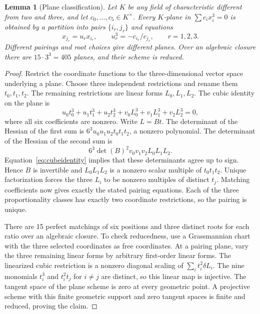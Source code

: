 \documentclass[11pt]{article}
\newtheorem{lemma}[theorem]{Lemma}
\theoremstyle{remark}\newtheorem{remark}[theorem]{Remark}
\begin{document}
\begin{lemma}[Plane classification]\label{lem:planes}
Let $K$ be any field of characteristic different from two and three, and let $c_0,\ldots,c_5\in K^\times$. Every $K$-plane in $\sum c_i x_i^3=0$ is obtained by a partition into pairs $\{i_r,j_r\}$ and equations
\[
x_{j_r}=u_r x_{i_r},\qquad u_r^3=-c_{i_r}/c_{j_r},\qquad r=1,2,3.
\]
Different pairings and root choices give different planes. Over an algebraic closure there are $15\cdot3^3=405$ planes, and their scheme is reduced.
\end{lemma}
\begin{proof}
Restrict the coordinate functions to the three-dimensional vector space underlying a plane. Choose three independent restrictions and rename them $t_0,t_1,t_2$. The remaining restrictions are linear forms $L_0,L_1,L_2$. The cubic identity on the plane is
\begin{equation}\label{eq:cubeidentity}
u_0t_0^3+u_1t_1^3+u_2t_2^3+
 v_0L_0^3+v_1L_1^3+v_2L_2^3=0,
\end{equation}
where all six coefficients are nonzero. Write $L=Bt$. The determinant of the Hessian of the first sum is
$6^3u_0u_1u_2t_0t_1t_2$, a nonzero polynomial. The determinant of the Hessian of the second sum is
\[
6^3\det(B)^2v_0v_1v_2L_0L_1L_2.
\]
Equation~\eqref{eq:cubeidentity} implies that these determinants agree up to sign. Hence $B$ is invertible and $L_0L_1L_2$ is a nonzero scalar multiple of $t_0t_1t_2$. Unique factorization forces the three $L_i$ to be nonzero multiples of distinct $t_j$. Matching coefficients now gives exactly the stated pairing equations. Each of the three proportionality classes has exactly two coordinate restrictions, so the pairing is unique.

There are 15 perfect matchings of six positions and three distinct roots for each ratio over an algebraic closure. To check reducedness, use a Grassmannian chart with the three selected coordinates as free coordinates. At a pairing plane, vary the three remaining linear forms by arbitrary first-order linear forms. The linearized cubic restriction is a nonzero diagonal scaling of
$\sum_i t_i^2\delta L_i$. The nine monomials $t_i^3$ and $t_i^2t_j$ for $i\ne j$ are distinct, so this linear map is injective. The tangent space of the plane scheme is zero at every geometric point. A projective scheme with this finite geometric support and zero tangent spaces is finite and reduced, proving the claim.
\end{proof}
\end{document}
